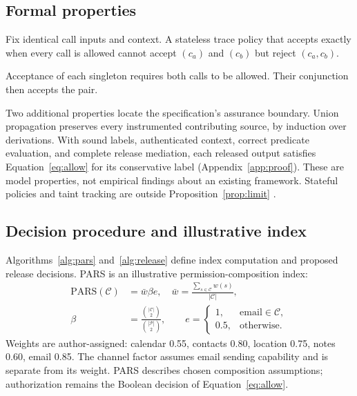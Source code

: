 \subsection{Formal properties}\label{sec:prop}

\begin{proposition}\label{prop:limit}
Fix identical call inputs and context. A stateless trace policy that accepts exactly when every call is allowed cannot accept $(c_a)$ and $(c_b)$ but reject $(c_a,c_b)$.
\end{proposition}
\begin{pf}
Acceptance of each singleton requires both calls to be allowed. Their conjunction then accepts the pair.
\end{pf}

Two additional properties locate the specification's assurance boundary. Union propagation preserves every instrumented contributing source, by induction over derivations. With sound labels, authenticated context, correct predicate evaluation, and complete release mediation, each released output satisfies Equation~\eqref{eq:allow} for its conservative label (Appendix~\ref{app:proof}). These are model properties, not empirical findings about an existing framework. Stateful policies and taint tracking are outside Proposition~\ref{prop:limit} \cite{enck2010taintdroid,arzt2014flowdroid}.

\subsection{Decision procedure and illustrative index}\label{sec:pars}

Algorithms~\ref{alg:pars} and~\ref{alg:release} define index computation and proposed release decisions. PARS is an illustrative permission-composition index:
\begin{equation}\label{eq:pars}
\begin{aligned}
\mathrm{PARS}(\mathcal C)&=\bar w\beta e,\quad
\bar w=\frac{\sum_{s\in\mathcal C}w(s)}{|\mathcal C|},\\
\beta&=\frac{\binom{|\mathcal C|}{2}}{\binom{|\mathcal P|}{2}},\qquad
 e=\begin{cases}1,&\mathrm{email}\in\mathcal C,\\0.5,&\text{otherwise}.\end{cases}
\end{aligned}
\end{equation}
Weights are author-assigned: calendar 0.55, contacts 0.80, location 0.75, notes 0.60, email 0.85. The channel factor assumes email sending capability and is separate from its weight. PARS describes chosen composition assumptions; authorization remains the Boolean decision of Equation~\eqref{eq:allow}.

